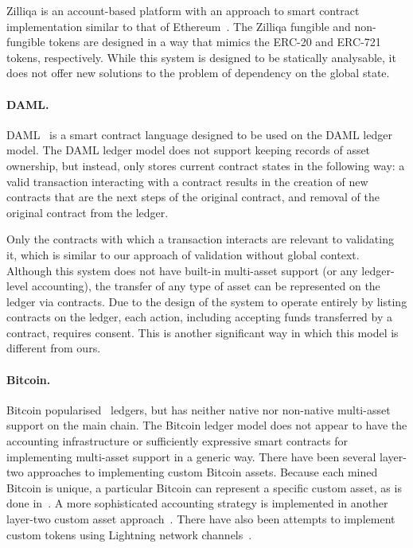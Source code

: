 Zilliqa
is an account-based platform with an approach to smart contract implementation
similar to that of Ethereum~\cite{scilla-arxiv}.
The Zilliqa fungible and non-fungible tokens are
designed in a way that mimics the ERC-20 and ERC-721 tokens, respectively.
While this system is designed to be statically analysable, it does not offer new solutions to
the problem of dependency on the global state.

\paragraph{DAML.}

DAML~\cite{daml} is a smart contract language designed to be used on the DAML ledger model.
The DAML ledger model does not support keeping records of asset ownership, but instead,
only stores current contract states in the following way:
a valid transaction interacting with a contract results in the creation of new
contracts that are the next
steps of the original contract, and removal of the original contract from the ledger.

Only the contracts with which a transaction
interacts are relevant to validating it, which is similar to our approach
of validation without global context.
Although this system does not have built-in multi-asset support (or any
ledger-level accounting),
the transfer of any type of asset can be represented on the ledger via contracts.
Due to the design of the system to operate entirely by listing contracts on the ledger,
each
action, including accepting funds transferred by a contract, requires consent. This
is another significant way
in which this model is different from ours.


\paragraph{Bitcoin.}

Bitcoin popularised \UTXO\ ledgers, but has neither native nor non-native
multi-asset support on the main chain.
The Bitcoin ledger model does not appear to have the accounting infrastructure
or sufficiently expressive
smart contracts for implementing multi-asset support in a generic way.
There have been several layer-two approaches to implementing custom Bitcoin assets.
Because each mined Bitcoin is unique, a particular
Bitcoin can represent a specific custom asset, as is done in~\cite{coloredcoins}.
A more sophisticated accounting strategy is implemented in another layer-two
custom asset approach~\cite{nick2020liquid}.
There have also been attempts to implement custom tokens using Lightning network
channels~\cite{lntokens}.

